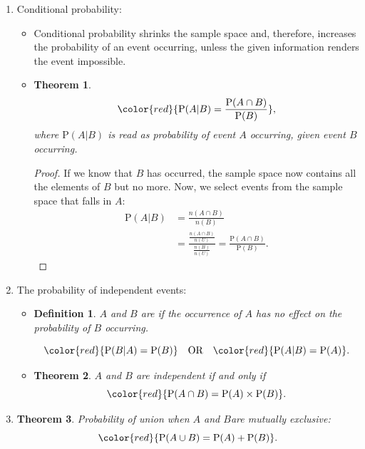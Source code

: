 \documentclass[12pt, a4paper]{article}
\newtheorem{theorem}{Theorem}[subsection]
\newtheorem{definition}{Definition}[subsection]
\newtheorem{proof}{Proof}[subsection]
\def\P{\mathrm{P}}
\begin{document}
\begin{enumerate}
\begin{proof}
        $$\begin{aligned}
            \P(A\cup B)=\frac{n(A\cup B)}{n(U)}&=\frac{n(A)+n(B)-n(A\cap B)}{n(U)}\\
            &=\P(A)+\P(B)-\P(A\cap B).
        \end{aligned}$$
    \end{proof}
    \item Conditional probability: 
    \begin{itemize}
        \item Conditional probability shrinks the sample space and, therefore, increases the probability of an event occurring, unless the given information renders the event impossible. 
        \item \begin{theorem} 
            $${\color{red}{\P(A|B)=\frac{\P(A\cap B)}{\P(B)}}},$$
            where $\P(A|B)$ is read as probability of event $A$ occurring, given event $B$ occurring. 
        \end{theorem}
        \begin{proof}
            If we know that $B$ has occurred, the sample space now contains all the elements of $B$ but no more. Now, we select events from the sample space that falls in $A$: 
            $$\begin{aligned}
                \P(A|B)&=\frac{n(A\cap B)}{n(B)}\\
                &=\frac{\frac{n(A\cap B)}{n(U)}}{\frac{n(B)}{n(U)}}=\frac{\P(A\cap B)}{\P(B)}.
            \end{aligned}$$
        \end{proof}
    \end{itemize}
    \item The probability of independent events: 
    \begin{itemize}
        \item \begin{definition}$A$ and $B$ are \textbf{\color{red}{independent events}} if the occurrence of $A$ has no effect on the probability of $B$ occurring. \end{definition}
        $${\color{red}{\P(B|A)=\P(B)}}\text{\quad OR\quad}{\color{red}{\P(A|B)=\P(A)}}.$$
        \item \begin{theorem} $A$ and $B$ are independent if and only if $${\color{red}{\P(A\cap B)=\P(A)\times \P(B)}}.$$\end{theorem}
    \end{itemize}
    \item \begin{theorem}Probability of union when $A$ and $B$are mutually exclusive: $${\color{red}{\P(A\cup B)=\P(A)+\P(B)}}.$$\end{theorem}
\end{enumerate}
\end{document}
